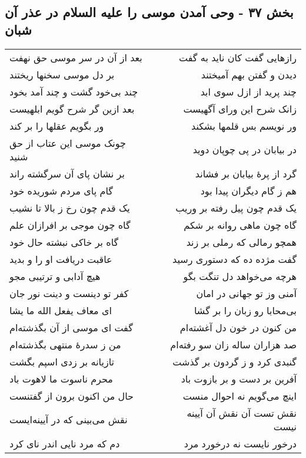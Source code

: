 \begin{center}
\section*{بخش ۳۷ - وحی آمدن موسی را علیه السلام در عذر آن شبان}
\label{sec:sh037}
\begin{longtable}{l p{0.5cm} r}
بعد از آن در سر موسی حق نهفت
&&
رازهایی گفت کان ناید به گفت
\\
بر دل موسی سخنها ریختند
&&
دیدن و گفتن بهم آمیختند
\\
چند بی‌خود گشت و چند آمد بخود
&&
چند پرید از ازل سوی ابد
\\
بعد ازین گر شرح گویم ابلهیست
&&
زانک شرح این ورای آگهیست
\\
ور بگویم عقلها را بر کند
&&
ور نویسم بس قلمها بشکند
\\
چونک موسی این عتاب از حق شنید
&&
در بیابان در پی چوپان دوید
\\
بر نشان پای آن سرگشته راند
&&
گرد از پرهٔ بیابان بر فشاند
\\
گام پای مردم شوریده خود
&&
هم ز گام دیگران پیدا بود
\\
یک قدم چون رخ ز بالا تا نشیب
&&
یک قدم چون پیل رفته بر وریب
\\
گاه چون موجی بر افرازان علم
&&
گاه چون ماهی روانه بر شکم
\\
گاه بر خاکی نبشته حال خود
&&
همچو رمالی که رملی بر زند
\\
عاقبت دریافت او را و بدید
&&
گفت مژده ده که دستوری رسید
\\
هیچ آدابی و ترتیبی مجو
&&
هرچه می‌خواهد دل تنگت بگو
\\
کفر تو دینست و دینت نور جان
&&
آمنی وز تو جهانی در امان
\\
ای معاف یفعل الله ما یشا
&&
بی‌محابا رو زبان را بر گشا
\\
گفت ای موسی از آن بگذشته‌ام
&&
من کنون در خون دل آغشته‌ام
\\
من ز سدرهٔ منتهی بگذشته‌ام
&&
صد هزاران ساله زان سو رفته‌ام
\\
تازیانه بر زدی اسپم بگشت
&&
گنبدی کرد و ز گردون بر گذشت
\\
محرم ناسوت ما لاهوت باد
&&
آفرین بر دست و بر بازوت باد
\\
حال من اکنون برون از گفتنست
&&
اینچ می‌گویم نه احوال منست
\\
نقش می‌بینی که در آیینه‌ایست
&&
نقش تست آن نقش آن آیینه نیست
\\
دم که مرد نایی اندر نای کرد
&&
درخور نایست نه درخورد مرد
\\

\end{longtable}
\end{center}
